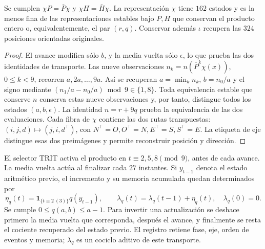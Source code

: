 \begin{proposition}
\label{ii:prd-arit:minimal}
Se cumplen \(\chi P=\overline P\chi\) y
\(\chi H=\overline H\chi\). La representación \(\chi\)
tiene \(162\) estados y es la menos fina de las representaciones
estables bajo \(P,H\) que conservan el producto entero o,
equivalentemente, el par \((r,q)\). Conservar además \(\iota\)
recupera las \(324\) posiciones orientadas originales.
\end{proposition}
\begin{proof}
El avance modifica sólo \(b\), y la media vuelta sólo
\(\epsilon\), lo que prueba las dos identidades de transporte.
Las nueve observaciones \(n_k=n(\overline P^k\chi(x))\),
\(0\leq k<9\), recorren \(a,2a,\ldots,9a\). Así se recuperan
\(a=\min_k n_k\), \(b=n_0/a\) y el signo mediante
\((n_1/a-n_0/a)\bmod9\in\{1,8\}\). Toda equivalencia estable
que conserve \(n\) conserva estas nueve observaciones y, por
tanto, distingue todos los estados \((a,b,\epsilon)\).
La identidad \(n=r+9q\) prueba la equivalencia de las dos
evaluaciones. Cada fibra de \(\chi\) contiene las dos rutas
transpuestas: \((i,j,d)\mapsto(j,i,d^\top)\), con
\(N^\top=O,O^\top=N,E^\top=S,S^\top=E\). La etiqueta de eje distingue
esas dos preimágenes y permite reconstruir posición y dirección.
\end{proof}

El selector TRIT activa el producto en \(t\equiv2,5,8\pmod9\),
antes de cada avance. La media vuelta actúa al finalizar cada
\(27\) instantes. Si \(y_{t-1}\) denota el estado aritmético
previo, el incremento y su memoria acumulada quedan determinados por
\begin{equation}
 \eta_q(t)=\mathbf1_{\{t\equiv2\ (3)\}}q(y_{t-1}),\qquad
 \lambda_q(t)=\lambda_q(t-1)+\eta_q(t),\quad \lambda_q(0)=0.
 \label{ii:prd-arit:incremento}
\end{equation}
Se cumple \(0\leq q(a,b)\leq a-1\). Para invertir una
actualización se deshace primero la media vuelta que corresponda,
después el avance, y finalmente se resta el cociente recuperado del
estado previo. El registro retiene fase, eje, orden de eventos y
memoria; \(\lambda_q\) es un cociclo aditivo de este transporte.

